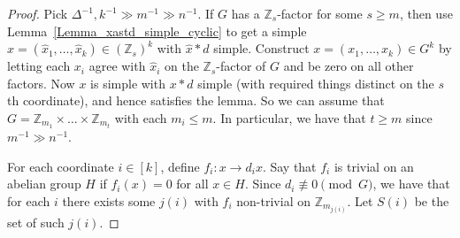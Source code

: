 \documentclass[a4paper,11pt,hidelinks]{amsart}
\theoremstyle{definition}
\begin{document}
\begin{proof}
Pick $\Delta^{-1}, k^{-1}\gg m^{-1}\gg n^{-1}$.
If $G$ has a $\mathbb{Z}_s$-factor for some $s\geq m$, then use Lemma~\ref{Lemma_xastd_simple_cyclic} to get a simple $\hat x=(\hat x_1, \dots, \hat x_k)\in (\mathbb{Z}_s)^k$ with $\hat x\ast d$ simple. Construct $x=(x_1, \dots, x_k)\in G^{k}$  by letting each $x_i$ agree with $\hat x_i$ on the $\mathbb{Z}_s$-factor of $G$ and be zero on all other factors. Now $x$ is simple with $x\ast d$ simple (with required things distinct on the $s$th coordinate), and hence satisfies the lemma. So we can assume that $G=\mathbb{Z}_{m_1}\times \dots \times \mathbb{Z}_{m_t}$ with each $m_i\leq m$. In particular, we have that $t\geq m$ since $m^{-1}\gg n^{-1}$.


For each coordinate $i\in [k]$, define $f_i:x\to d_ix$. Say that $f_i$ is trivial on an abelian group $H$ if $f_i(x)=0$ for all $x\in H$.
Since $d_i\not\equiv 0\pmod G$, we have that for each $i$ there exists some $j(i)$ with $f_i$ non-trivial on $\mathbb{Z}_{m_{j(i)}}$. Let $S(i)$ be the set of such $j(i)$.


\end{proof}
\end{document}
